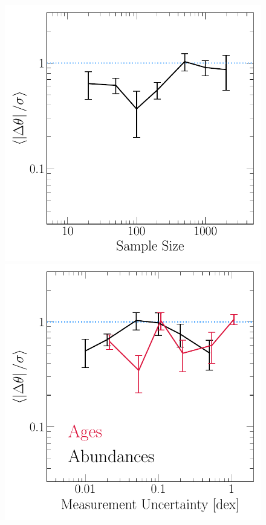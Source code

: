 \documentclass[ms.tex]{subfiles}
\begin{document}
\begin{figure}
\centering
\includegraphics[scale = 0.45]{dp_sigma_samplesize.pdf}
\includegraphics[scale = 0.45]{dp_sigma_precision.pdf}

\end{figure}
\end{document}

